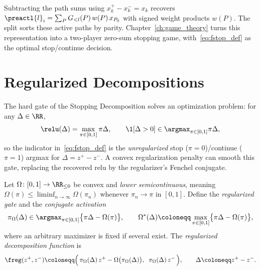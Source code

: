 Subtracting the path sums using $x_k^+-x_k^-=x_k$ recovers $\preactl{l}_i=\sum_P G_{<l}(P)\,w(P)\,x_{P_0}$ with signed weight products $w(P)$. The split sorts these active paths by parity. Chapter~\ref{ch:game_theory} turns this representation into a two-player zero-sum stopping game, with~\eqref{eq:fstop_def} as the optimal stop/continue decision.

\section{Regularized Decompositions}\label{sec:regularized_decompositions}

The hard gate of the Stopping Decomposition solves an optimization problem: for any $\Delta \in \RR$,
\begin{equation}
	\relu(\Delta) = \max_{\pi \in [0,1]} \pi \Delta,
	\qquad
	\1[\Delta > 0] \in \argmax_{\pi \in [0,1]} \pi \Delta,
	\label{eq:gate_as_argmax}
\end{equation}
so the indicator in~\eqref{eq:fstop_def} is the \emph{unregularized} stop ($\pi = 0$)/continue ($\pi = 1$) argmax for $\Delta = z^+ - z^-$. A convex regularization penalty can smooth this gate, replacing the recovered \ac{relu} by the regularizer's Fenchel conjugate.

\begin{definition}\label{def:freg}
Let $\Omega \colon [0,1] \to \RR_{\le 0}$ be convex and \emph{lower semicontinuous}, meaning $\Omega(\pi)\le\liminf_{n\to\infty}\Omega(\pi_n)$ whenever $\pi_n\to\pi$ in $[0,1]$. Define the \emph{regularized gate} and the \emph{conjugate activation}
\begin{equation}
	\pi_\Omega(\Delta) \in \argmax_{\pi \in [0,1]} \bigl\{ \pi \Delta - \Omega(\pi) \bigr\},
	\qquad
	\Omega^*(\Delta) \coloneqq \max_{\pi \in [0,1]} \bigl\{ \pi \Delta - \Omega(\pi) \bigr\},
	\label{eq:regularized_gate}
\end{equation}
where an arbitrary maximizer is fixed if several exist. The \emph{regularized decomposition function} is
\begin{equation}
	\freg(z^+, z^-) \coloneqq \Bigl(\, \pi_\Omega(\Delta)\, z^+ - \Omega\bigl(\pi_\Omega(\Delta)\bigr), \;\; \pi_\Omega(\Delta)\, z^- \,\Bigr),
	\qquad
	\Delta \coloneqq z^+ - z^-.
	\label{eq:freg_def}
\end{equation}
\end{definition}

